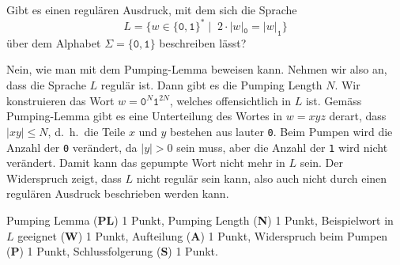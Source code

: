 Gibt es einen regulären Ausdruck, mit dem sich die Sprache
\[
L=\{
w\in\{\texttt{0},\texttt{1}\}^*
\;|\;\;
2\cdot|w|_{\texttt{0}}
=
|w|_{\texttt{1}}
\}
\]
über dem Alphabet $\Sigma=\{\texttt{0},\texttt{1}\}$ beschreiben lässt?


\begin{loesung}
Nein, wie man mit dem Pumping-Lemma beweisen kann.
Nehmen wir also an, dass die Sprache $L$ regulär ist.
Dann gibt es die Pumping Length $N$.
Wir konstruieren das Wort $w=\texttt{0}^N\texttt{1}^{2N}$, welches
offensichtlich in $L$ ist.
Gemäss Pumping-Lemma gibt es eine Unterteilung des Wortes in
$w=xyz$ derart, dass $|xy|\le N$, d.~h.~die Teile $x$ und $y$ bestehen
aus lauter \texttt{0}.
Beim Pumpen wird die Anzahl der \texttt{0} verändert, da $|y|>0$ sein
muss, aber die Anzahl der \texttt{1} wird nicht verändert.
Damit kann das gepumpte Wort nicht mehr in $L$ sein.
Der Widerspruch zeigt, dass $L$ nicht regulär sein kann, also auch nicht
durch einen regulären Ausdruck beschrieben werden kann.
\end{loesung}

\begin{bewertung}
Pumping Lemma ({\bf PL}) 1 Punkt,
Pumping Length ({\bf N}) 1 Punkt,
Beispielwort in $L$ geeignet ({\bf W}) 1 Punkt,
Aufteilung ({\bf A}) 1 Punkt,
Widerspruch beim Pumpen ({\bf P}) 1 Punkt,
Schlussfolgerung ({\bf S}) 1 Punkt.
\end{bewertung}

